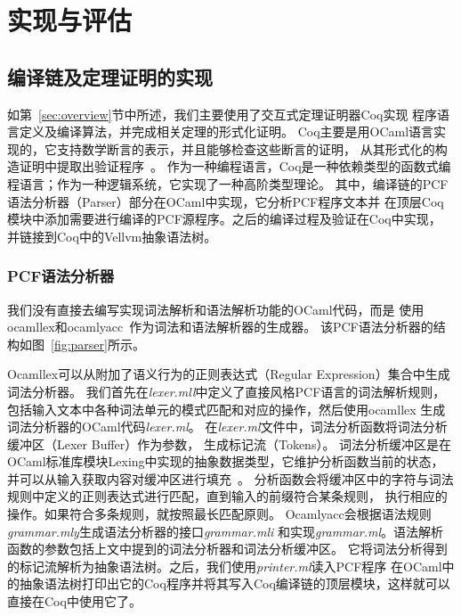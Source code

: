 
\chapter{实现与评估} \label{ch:implement}

\section{编译链及定理证明的实现}

如第~\ref{sec:overview}节中所述，我们主要使用了交互式定理证明器Coq实现
程序语言定义及编译算法，并完成相关定理的形式化证明。
Coq主要是用OCaml语言实现的，它支持数学断言的表示，并且能够检查这些断言的证明，
从其形式化的构造证明中提取出验证程序~\cite{paulin2011introduction}。
作为一种编程语言，Coq是一种依赖类型的函数式编程语言；作为一种逻辑系统，它实现了一种高阶类型理论。
其中，编译链的PCF语法分析器（Parser）部分在OCaml中实现，它分析PCF程序文本并
在顶层Coq模块中添加需要进行编译的PCF源程序。之后的编译过程及验证在Coq中实现，
并链接到Coq中的Vellvm抽象语法树。

\subsection{PCF语法分析器}
我们没有直接去编写实现词法解析和语法解析功能的OCaml代码，而是
使用ocamllex和ocamlyacc~\cite{smith2007ocamllex}作为词法和语法解析器的生成器。
该PCF语法分析器的结构如图~\ref{fig:parser}所示。

Ocamllex可以从附加了语义行为的正则表达式（Regular Expression）集合中生成词法分析器。
我们首先在\textit{lexer.mll}中定义了直接风格PCF语言的词法解析规则，
包括输入文本中各种词法单元的模式匹配和对应的操作，然后使用ocamllex
生成词法分析器的OCaml代码\textit{lexer.ml}。
在\textit{lexer.ml}文件中，词法分析函数将词法分析缓冲区（Lexer Buffer）作为参数，
生成标记流（Tokens）。
词法分析缓冲区是在OCaml标准库模块Lexing中实现的抽象数据类型，它维护分析函数当前的状态，
并可以从输入获取内容对缓冲区进行填充~\cite{leroy2021ocaml}。
分析函数会将缓冲区中的字符与词法规则中定义的正则表达式进行匹配，直到输入的前缀符合某条规则，
执行相应的操作。如果符合多条规则，就按照最长匹配原则。
Ocamlyacc会根据语法规则\textit{grammar.mly}生成语法分析器的接口\textit{grammar.mli}
和实现\textit{grammar.ml}。语法解析函数的参数包括上文中提到的词法分析器和词法分析缓冲区。
它将词法分析得到的标记流解析为抽象语法树。之后，我们使用\textit{printer.ml}读入PCF程序
在OCaml中的抽象语法树打印出它的Coq程序并将其写入Coq编译链的顶层模块，这样就可以直接在Coq中使用它了。

